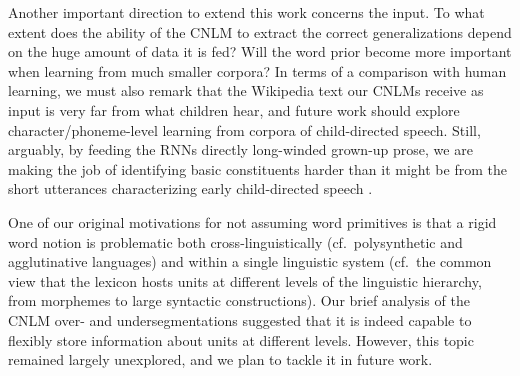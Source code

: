 Another important direction to extend this work concerns the input. To
what extent does the ability of the CNLM to extract the correct
generalizations depend on the huge amount of data it is fed?  Will the
word prior become more important when learning from much smaller
corpora? In terms of a comparison with human learning, we must also
remark that the Wikipedia text our CNLMs receive as input is very far
from what children hear, and future work should explore
character/phoneme-level learning from corpora of child-directed
speech. Still, arguably, by feeding the RNNs directly long-winded
grown-up prose, we are making the job of identifying basic
constituents harder than it might be from the short utterances
characterizing early child-directed speech \cite{Tomasello:2003}.


One of our original motivations for not assuming word primitives is that a rigid word notion is problematic both cross-linguistically (cf.~polysynthetic and agglutinative languages) and within a single linguistic system (cf.~the common  view  that the lexicon hosts units at different levels of the linguistic hierarchy, from  morphemes to large syntactic constructions). Our brief analysis of the CNLM over- and undersegmentations suggested that it is indeed capable to flexibly store information about units at different levels. However, this topic  remained largely unexplored, and we plan to tackle it in future work.



